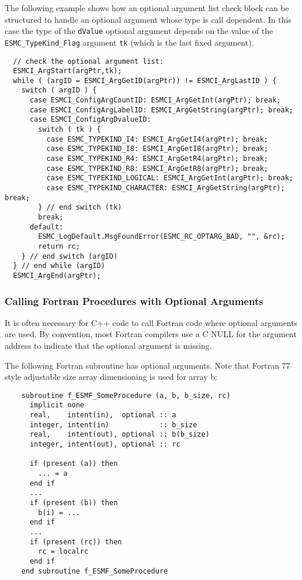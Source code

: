 \noindent
The following example shows how an optional argument list check block can be
structured to handle an optional argument whose type is call dependent. In this
case the type of the \texttt{dValue} optional argument depends on the value of the
\texttt{ESMC\_TypeKind\_Flag} argument \texttt{tk} (which is the last fixed argument).
\begin{verbatim}
  // check the optional argument list:
  ESMCI_ArgStart(argPtr,tk);
  while ( (argID = ESMCI_ArgGetID(argPtr)) != ESMCI_ArgLastID ) {
    switch ( argID ) {
      case ESMCI_ConfigArgCountID: ESMCI_ArgGetInt(argPtr); break;
      case ESMCI_ConfigArgLabelID: ESMCI_ArgGetString(argPtr); break;
      case ESMCI_ConfigArgDvalueID:
        switch ( tk ) {
          case ESMC_TYPEKIND_I4: ESMCI_ArgGetI4(argPtr); break;
          case ESMC_TYPEKIND_I8: ESMCI_ArgGetI8(argPtr); break;
          case ESMC_TYPEKIND_R4: ESMCI_ArgGetR4(argPtr); break;
          case ESMC_TYPEKIND_R8: ESMCI_ArgGetR8(argPtr); break;
          case ESMC_TYPEKIND_LOGICAL: ESMCI_ArgGetInt(argPtr); break;
          case ESMC_TYPEKIND_CHARACTER: ESMCI_ArgGetString(argPtr); break;
        } // end switch (tk)
        break;
      default:
        ESMC_LogDefault.MsgFoundError(ESMC_RC_OPTARG_BAD, "", &rc);
        return rc;
    } // end switch (argID)
  } // end while (argID)
  ESMCI_ArgEnd(argPtr);
\end{verbatim}



\subsubsection{Calling Fortran Procedures with Optional Arguments}

It is often necessary for C++ code to call Fortran code where optional arguments are
used.  By convention, most Fortran compilers use a C NULL for the argument address
to indicate that the optional argument is missing.

The following Fortran subroutine has optional arguments.  Note that Fortran 77 style
adjustable size array dimensioning is used for array b:

\begin{verbatim}
    subroutine f_ESMF_SomeProcedure (a, b, b_size, rc)
      implicit none
      real,    intent(in),  optional :: a
      integer, intent(in)            :: b_size
      real,    intent(out), optional :: b(b_size)
      integer, intent(out), optional :: rc

      if (present (a)) then
        ... = a
      end if
      ...
      if (present (b)) then
        b(i) = ...
      end if
      ...
      if (present (rc)) then
        rc = localrc
      end if
    end subroutine f_ESMF_SomeProcedure
\end{verbatim}

